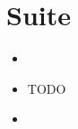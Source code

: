 \documentclass{beamer}
\begin{document}
	\section{Suite}

		\begin{frame}
			\large{\textsc{\insertsectionhead}}
			\begin{itemize}
				\item[]
				\item TODO
				\item[]
			\end{itemize}
		\end{frame}


	\section*{~}

		\begin{frame}
			\maketitle
		\end{frame}
\end{document}
